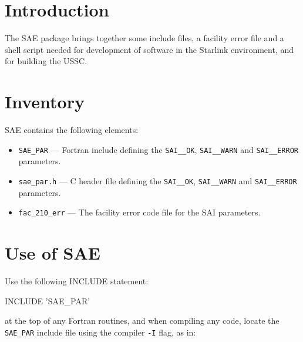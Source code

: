 \documentclass[11pt,nolof]{starlink}
\begin{document}
\scfrontmatter

\section{Introduction}

The SAE package brings together some include files, a facility error file
and a shell script needed for development of software in the Starlink
environment, and for building the USSC.

\section{Inventory}

SAE contains the following elements:

\begin{itemize}

\item \texttt{SAE\_PAR} --- Fortran include defining the \texttt{SAI\_\_OK},
\texttt{SAI\_\_WARN} and \texttt{SAI\_\_ERROR} parameters.

\item \texttt{sae\_par.h} --- C header file defining the \texttt{SAI\_\_OK},
\texttt{SAI\_\_WARN} and \texttt{SAI\_\_ERROR} parameters.

\item \texttt{fac\_210\_err} --- The facility error code file for the SAI
parameters.

\end{itemize}

\section{Use of SAE}

Use the following INCLUDE statement:

\begin{terminalv}
INCLUDE 'SAE_PAR'
\end{terminalv}

at the top of any Fortran routines, and when compiling any code, locate the
\texttt{SAE\_PAR} include file using the compiler \texttt{-I} flag, as in:
\begin{terminalv}
\end{terminalv}
\end{document}
